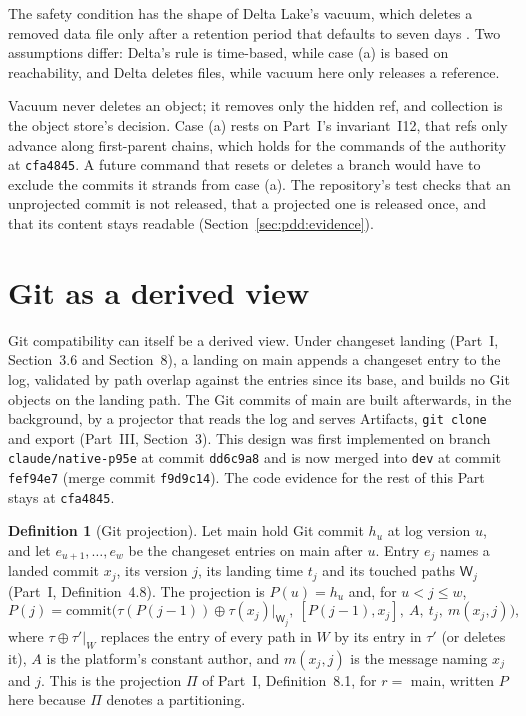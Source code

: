 \documentclass[11pt,letterpaper]{article}
\theoremstyle{definition}
\newtheorem{definition}[theorem]{Definition}
\theoremstyle{remark}
\newcommand{\tree}{\tau}
\newcommand{\W}{\mathsf{W}}
\DeclareRobustCommand{\code}[1]{{\def\_{\textunderscore\allowbreak}\texttt{#1}}}
\begin{document}
The safety condition has the shape of Delta Lake's vacuum, which deletes a removed data file only after a retention period that defaults to seven days \cite{deltaprotocol}. Two assumptions differ: Delta's rule is time-based, while case (a) is based on reachability, and Delta deletes files, while vacuum here only releases a reference.

Vacuum never deletes an object; it removes only the hidden ref, and collection is the object store's decision. Case (a) rests on Part~I's invariant~I12, that refs only advance along first-parent chains, which holds for the commands of the authority at \code{cfa4845}. A future command that resets or deletes a branch would have to exclude the commits it strands from case (a). The repository's test checks that an unprojected commit is not released, that a projected one is released once, and that its content stays readable (Section~\ref{sec:pdd:evidence}).

\section{Git as a derived view}
\label{sec:pdd:git}

Git compatibility can itself be a derived view. Under changeset landing (Part~I, Section~3.6 and Section~8), a landing on main appends a changeset entry to the log, validated by path overlap against the entries since its base, and builds no Git objects on the landing path. The Git commits of main are built afterwards, in the background, by a projector that reads the log and serves Artifacts, \code{git clone} and export (Part~III, Section~3). This design was first implemented on branch \code{claude/native-p95e} at commit \code{dd6c9a8} and is now merged into \code{dev} at commit \code{fef94e7} (merge commit \code{f9d9c14}). The code evidence for the rest of this Part stays at \code{cfa4845}.

\begin{definition}[Git projection]
\label{def:pdd:projection}
Let main hold Git commit $h_u$ at log version $u$, and let $e_{u+1},\ldots,e_{w}$ be the changeset entries on main after $u$. Entry $e_j$ names a landed commit $x_j$, its version $j$, its landing time $t_j$ and its touched paths $\W_j$ (Part~I, Definition~4.8). The projection is $P(u)=h_u$ and, for $u<j\le w$,
\[
P(j)=\mathrm{commit}\bigl(\tree(P(j-1))\oplus\tree(x_j)|_{\W_j},\ [P(j-1),x_j],\ A,\ t_j,\ m(x_j,j)\bigr),
\]
where $\tree\oplus\tree'|_{W}$ replaces the entry of every path in $W$ by its entry in $\tree'$ (or deletes it), $A$ is the platform's constant author, and $m(x_j,j)$ is the message naming $x_j$ and $j$. This is the projection $\Pi$ of Part~I, Definition~8.1, for $r=$ main, written $P$ here because $\Pi$ denotes a partitioning.
\end{definition}
\end{document}
